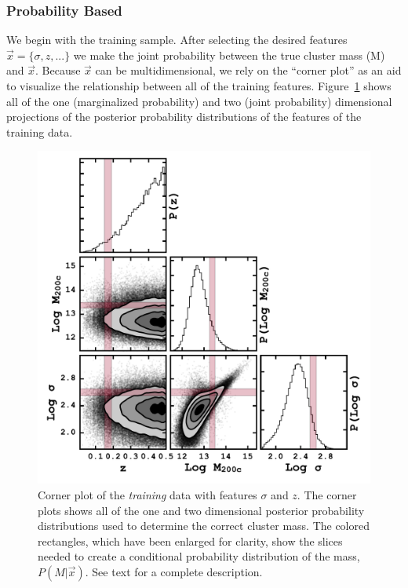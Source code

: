 \documentclass[fleqn,usenatbib]{mnras}
\begin{document}
\subsubsection{Probability Based}\label{sec:probability method}
We begin with the training sample. After selecting the desired features $\vec{x} = \{\sigma, z, ...\}$ we make the joint probability between the true cluster mass (M) and $\vec{x}$. Because $\vec{x}$ can be multidimensional, we rely on the ``corner plot'' as an aid to visualize the relationship between all of the training features. Figure~\ref{fig: probability corner} shows all of the one (marginalized probability) and two (joint probability) dimensional projections of the posterior probability distributions of the features of the training data.

\begin{figure} 
	\includegraphics[width=\columnwidth]{figures/cornertest.pdf} 
	\caption{Corner plot of the \emph{training} data with features $\sigma$ and $z$. The corner plots shows all of the one and two dimensional posterior probability distributions used to determine the correct cluster mass. The colored rectangles, which have been enlarged for clarity, show the slices needed to create a conditional probability distribution of the mass, $P(M|\vec{x})$. See text for a complete description. } \label{fig: probability corner} 
\end{figure}
\end{document}
